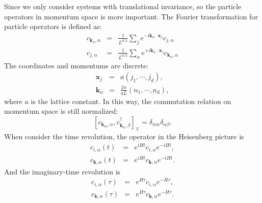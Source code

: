 \documentclass[journal=jacsat,manuscript=article]{achemso}
\begin{document}
Since we only consider systems with translational invariance, so the particle operators in momentum space is more important. The Fourier transformation for particle operators is defined as:
\begin{eqnarray}
	c_{\bm{k}_{n},\alpha} & = & 
	\frac{1}{L^{d/2}}\sum_{j}e^{-i\bm{k}_{n}\cdot\bm{x}_{j}}c_{j,\alpha}\\
	c_{j,\alpha} & = & 
	\frac{1}{L^{d/2}}\sum_{n}e^{+i\bm{k}_{n}\cdot\bm{x}_{j}}c_{\bm{k}_{n},\alpha}
\end{eqnarray}
The coordinates and momentums are discrete:
\begin{eqnarray}
	\bm{x}_{j} & = & a\left(j_{1},\cdots,j_{d}\right),\\
	\bm{k}_{n} & = & \frac{2\pi}{aL}\left(n_{1},\cdots,n_{d}\right),
\end{eqnarray}
where $a$ is the lattice constant. In this way, the commutation relation
on momentum space is still normalized:
\begin{equation}
\left[c_{\bm{k}_{m},\alpha},c_{\bm{k}_{n},\beta}^{\dagger}\right]_{\mp}=\delta_{mn}\delta_{\alpha\beta}.
\end{equation}
When consider the time revolution, the operator in the Heisenberg
picture is
\begin{eqnarray}
c_{i,\alpha}\left(t\right) & = & e^{iHt}c_{i,\alpha}e^{-iHt},\\
c_{\bm{k},\alpha}\left(t\right) & = & e^{iHt}c_{\bm{k},\alpha}e^{-iHt}.
\end{eqnarray}
And the imaginary-time revolution is
\begin{eqnarray}
c_{i,\alpha}\left(\tau\right) & = & e^{H\tau}c_{i,\alpha}e^{-H\tau},\\
c_{\bm{k},\alpha}\left(\tau\right) & = & e^{H\tau}c_{\bm{k},\alpha}e^{-H\tau}.
\end{eqnarray}
\end{document}
